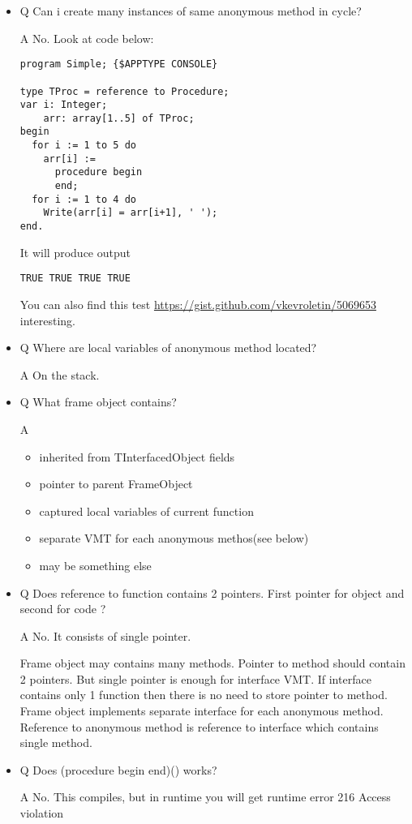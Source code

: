 \documentclass[11pt]{article}
\begin{document}
\begin{itemize}
\item Q Can i create many instances of same anonymous method in cycle?
  
  A No. Look at code below:

\begin{verbatim}
program Simple; {$APPTYPE CONSOLE}

type TProc = reference to Procedure;
var i: Integer;
    arr: array[1..5] of TProc;
begin
  for i := 1 to 5 do
    arr[i] :=
      procedure begin
      end;
  for i := 1 to 4 do
    Write(arr[i] = arr[i+1], ' ');
end.
\end{verbatim}
  It will produce output

\begin{verbatim}
TRUE TRUE TRUE TRUE
\end{verbatim}

  You can also find this test
  \href{https://gist.github.com/vkevroletin/5069653}{https://gist.github.com/vkevroletin/5069653} interesting.
\item Q Where are local variables of anonymous method located?

  A On the stack.
\item Q What frame object contains?

  A
\begin{itemize}
\item inherited from TInterfacedObject fields
\item pointer to parent FrameObject
\item captured local variables of current function
\item separate VMT for each anonymous methos(see below)
\item may be something else
\end{itemize}
\item Q Does reference to function contains 2 pointers. First pointer
  for object and second for code ?
 
  A No. It consists of single pointer.

  Frame object may contains many methods. Pointer to method should 
  contain 2 pointers.
  But single pointer is enough for interface VMT. If interface contains
  only 1 function then there is no need to store pointer to method.
  Frame object implements separate interface for each anonymous
  method. Reference to anonymous method is reference to interface
  which contains single method.
\item Q Does (procedure begin end)() works?

  A No. This compiles, but in runtime you will get
   runtime error 216
   Access violation
\end{itemize}
\end{document}
